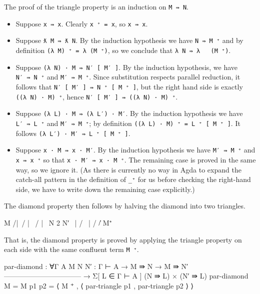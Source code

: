 The proof of the triangle property is an induction on \texttt{M\ ⇛\ N}.

\begin{itemize}
\item
  Suppose \texttt{x\ ⇛\ x}. Clearly \texttt{x\ ⁺\ =\ x}, so
  \texttt{x\ ⇛\ x}.
\item
  Suppose \texttt{ƛ\ M\ ⇛\ ƛ\ N}. By the induction hypothesis we have
  \texttt{N\ ⇛\ M\ ⁺} and by definition
  \texttt{(λ\ M)\ ⁺\ =\ λ\ (M\ ⁺)}, so we conclude that
  \texttt{λ\ N\ ⇛\ λ\ \ \ (M\ ⁺)}.
\item
  Suppose \texttt{(λ\ N)\ ·\ M\ ⇛\ N′\ {[}\ M′\ {]}}. By the induction
  hypothesis, we have \texttt{N′\ ⇛\ N\ ⁺} and \texttt{M′\ ⇛\ M\ ⁺}.
  Since substitution respects parallel reduction, it follows that
  \texttt{N′\ {[}\ M′\ {]}\ ⇛\ N\ ⁺\ {[}\ M\ ⁺\ {]}}, but the right hand
  side is exactly \texttt{((λ\ N)\ ·\ M)\ ⁺}, hence
  \texttt{N′\ {[}\ M′\ {]}\ ⇛\ ((λ\ N)\ ·\ M)\ ⁺}.
\item
  Suppose \texttt{(λ\ L)\ ·\ M\ ⇛\ (λ\ L′)\ ·\ M′}. By the induction
  hypothesis we have \texttt{L′\ ⇛\ L\ ⁺} and \texttt{M′\ ⇛\ M\ ⁺}; by
  definition \texttt{((λ\ L)\ ·\ M)\ ⁺\ =\ L\ ⁺\ {[}\ M\ ⁺\ {]}}. It
  follows \texttt{(λ\ L′)\ ·\ M′\ ⇛\ L\ ⁺\ {[}\ M\ ⁺\ {]}}.
\item
  Suppose \texttt{x\ ·\ M\ ⇛\ x\ ·\ M′}. By the induction hypothesis we
  have \texttt{M′\ ⇛\ M\ ⁺} and \texttt{x\ ⇛\ x\ ⁺} so that
  \texttt{x\ ·\ M′\ ⇛\ x\ ·\ M\ ⁺}. The remaining case is proved in the
  same way, so we ignore it. (As there is currently no way in Agda to
  expand the catch-all pattern in the definition of \texttt{\_⁺} for us
  before checking the right-hand side, we have to write down the
  remaining case explicitly.)
\end{itemize}

The diamond property then follows by halving the diamond into two
triangles.

\begin{myDisplay}
    M
   /|\
  / | \
 /  |  \
N   2   N′
 \  |  /
  \ | /
   \|/
    M⁺
\end{myDisplay}

That is, the diamond property is proved by applying the triangle
property on each side with the same confluent term \texttt{M\ ⁺}.

\begin{fence}
\begin{code}
par-diamond : ∀{Γ A} {M N N′ : Γ ⊢ A}
  → M ⇛ N
  → M ⇛ N′
    ---------------------------------
  → Σ[ L ∈ Γ ⊢ A ] (N ⇛ L) × (N′ ⇛ L)
par-diamond {M = M} p1 p2 = ⟨ M ⁺ , ⟨ par-triangle p1 , par-triangle p2 ⟩ ⟩
\end{code}
\end{fence}


